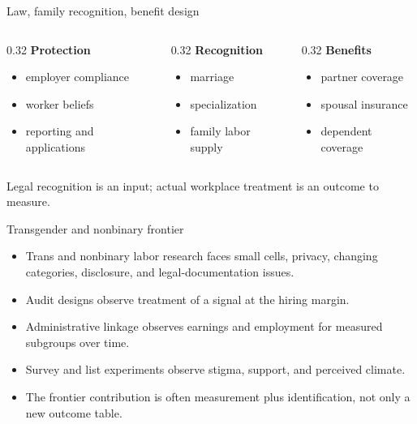 \documentclass[aspectratio=169,11pt]{beamer}
\begin{document}
\begin{frame}{Law, family recognition, benefit design}
\begin{columns}[T,onlytextwidth]
\begin{column}{0.32\linewidth}
\textbf{Protection}
\begin{itemize}
    \item employer compliance
    \item worker beliefs
    \item reporting and applications
\end{itemize}
\end{column}
\begin{column}{0.32\linewidth}
\textbf{Recognition}
\begin{itemize}
    \item marriage
    \item specialization
    \item family labor supply
\end{itemize}
\end{column}
\begin{column}{0.32\linewidth}
\textbf{Benefits}
\begin{itemize}
    \item partner coverage
    \item spousal insurance
    \item dependent coverage
\end{itemize}
\end{column}
\end{columns}
\vspace{0.2cm}
Legal recognition is an input; actual workplace treatment is an outcome to measure.
\end{frame}

\begin{frame}{Transgender and nonbinary frontier}
\begin{itemize}
    \item Trans and nonbinary labor research faces small cells, privacy, changing categories, disclosure, and legal-documentation issues.
    \item Audit designs observe treatment of a signal at the hiring margin.
    \item Administrative linkage observes earnings and employment for measured subgroups over time.
    \item Survey and list experiments observe stigma, support, and perceived climate.
    \item The frontier contribution is often measurement plus identification, not only a new outcome table.
\end{itemize}
\end{frame}
\end{document}
